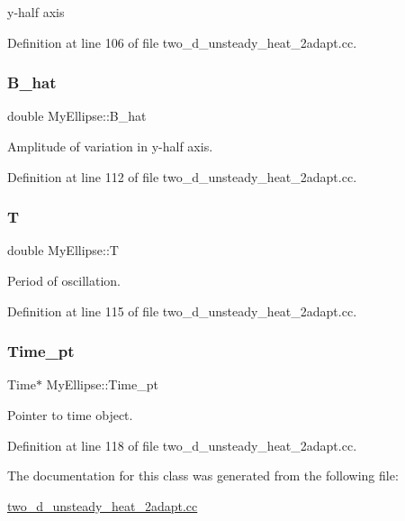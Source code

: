 y-\/half axis 



Definition at line 106 of file two\+\_\+d\+\_\+unsteady\+\_\+heat\+\_\+2adapt.\+cc.

\mbox{\label{classMyEllipse_a39d06488447d80f16b80ed8915edf3e3}} 
\subsubsection{\texorpdfstring{B\+\_\+hat}{B\_hat}}
{\footnotesize\ttfamily double My\+Ellipse\+::\+B\+\_\+hat\hspace{0.3cm}{\ttfamily [protected]}}



Amplitude of variation in y-\/half axis. 



Definition at line 112 of file two\+\_\+d\+\_\+unsteady\+\_\+heat\+\_\+2adapt.\+cc.

\mbox{\label{classMyEllipse_ab098069ab23bbbd8f30b0da3523dc87f}} 
\subsubsection{\texorpdfstring{T}{T}}
{\footnotesize\ttfamily double My\+Ellipse\+::T\hspace{0.3cm}{\ttfamily [protected]}}



Period of oscillation. 



Definition at line 115 of file two\+\_\+d\+\_\+unsteady\+\_\+heat\+\_\+2adapt.\+cc.

\mbox{\label{classMyEllipse_abc1c4c863a599ce87bdff1abb9971953}} 
\subsubsection{\texorpdfstring{Time\+\_\+pt}{Time\_pt}}
{\footnotesize\ttfamily Time$\ast$ My\+Ellipse\+::\+Time\+\_\+pt\hspace{0.3cm}{\ttfamily [protected]}}



Pointer to time object. 



Definition at line 118 of file two\+\_\+d\+\_\+unsteady\+\_\+heat\+\_\+2adapt.\+cc.



The documentation for this class was generated from the following file\+:\begin{DoxyCompactItemize}
\item 
\hyperlink{two__d__unsteady__heat__2adapt_8cc}{two\+\_\+d\+\_\+unsteady\+\_\+heat\+\_\+2adapt.\+cc}\end{DoxyCompactItemize}
